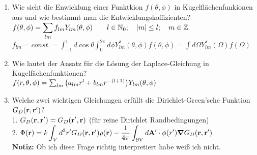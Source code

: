 \documentclass{scrartcl}
\newcommand{\ds}{\displaystyle}
\begin{document}
\begin{enumerate}
    \item Wie sieht die Enwicklung einer Funktkion $f(\theta,\phi)$ in
          Kugelflächenfunkionen aus und wie bestimmt man die 
          Entwicklungskoffizienten?\\
          $\ds f(\theta, \phi)=\sum_{lm} f_{lm}Y_{lm}(\theta,\phi)
          \qquad l\in \mathbb{N}_0;\quad \abs{m}\le l; 
          \quad m\in\mathbb{Z}$\\
          $\ds f_{lm}=const.
           =\int_{-1}^{1} d\cos\theta\int_0^{2\pi}d\phi 
           Y^*_{lm}(\theta,\phi)f(\theta,\phi)
           =\int d\Omega Y^*_{lm}(\Omega)f(\Omega)$\\

    \item Wie lautet der Ansatz für die Lösung der Laplace-Gleichung in
          Kugelfächenfunktionen?\\
          $f(r,\theta,\phi)=
          \sum_{lm}\qty(a_{lm}r^l+b_{lm}r^{-(l+1)})Y_{lm}(\theta,\phi)$
           

    \item Welche zwei wichtigen Gleichungen erfüllt die Dirichlet-Green'sche
          Funktion $G_D(\vb r, \vb r')$?\\
          1. $\ds G_D(\vb r, \vb r')= G_D(\vb r', \vb r)$ 
             (für reine Dirichlet Randbedingungen)\\
          2. $\ds \Phi(\vb r)=k\int_V d^3r' G_D(\vb r, \vb r')\rho(\vb r)
             -\frac{1}{4\pi}\int_{\partial V}d\vb A'\cdot\phi(r')
             \grad G_D(\vb r, \vb r')$\\
          \textbf{Notiz:} Ob ich diese Frage richtig interpretiert habe 
          weiß ich nicht.
          

  \end{enumerate}
  \newpage
\end{document}
